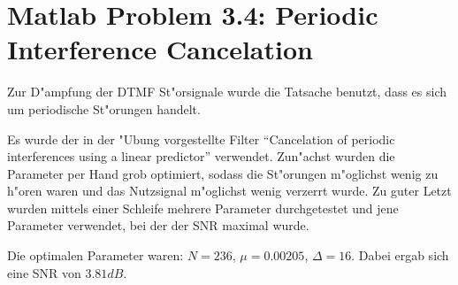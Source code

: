 \clearpage

\chapter{Matlab Problem 3.4: Periodic Interference Cancelation}

Zur D"ampfung der DTMF St"orsignale wurde die Tatsache benutzt, dass es sich um periodische St"orungen handelt.

Es wurde der in der "Ubung vorgestellte Filter ``Cancelation of periodic interferences using a linear predictor''
verwendet. Zun"achst wurden die Parameter per Hand grob optimiert, sodass die St"orungen m"oglichst
wenig zu h"oren waren und das Nutzsignal m"oglichst wenig verzerrt wurde. Zu guter Letzt wurden mittels einer
Schleife mehrere Parameter durchgetestet und jene Parameter verwendet, bei der der SNR maximal wurde.

Die optimalen Parameter waren: $N=236$, $\mu = 0.00205$, $\Delta = 16$. Dabei ergab sich eine SNR von $3.81dB$.